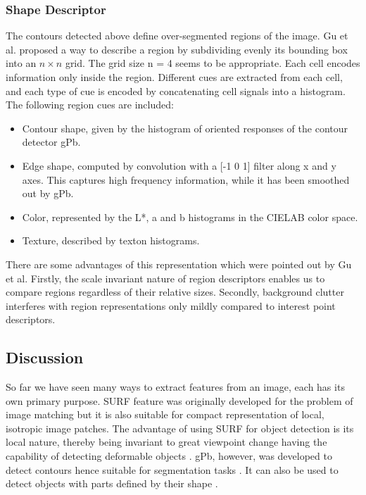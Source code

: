 \documentclass{SMBV12}
\begin{document}
\subsubsection{Shape Descriptor}
\label{sec:shape_descriptor}

The contours detected above define over-segmented regions of the image. Gu et al. \cite{gu2009recognition} proposed a way to describe a region by subdividing evenly its bounding box into an $n \times n$ grid. The grid size n = 4 seems to be appropriate. Each cell encodes information only inside the region. Different cues are extracted from each cell, and each type of cue is encoded by concatenating cell signals into a histogram. The following region cues are included:

\begin{itemize}
\item Contour shape, given by the histogram of oriented responses of the contour detector gPb.
\item Edge shape, computed by convolution with a [-1 0 1] filter along x and y axes. This captures high frequency information, while it has been smoothed out by gPb.
\item Color, represented by the L*, a and b histograms in the CIELAB color space.
\item Texture, described by texton histograms.
\end{itemize}

There are some advantages of this representation which were pointed out by Gu et al. Firstly, the scale invariant nature of region descriptors enables us to compare regions regardless of their relative sizes. Secondly, background clutter interferes with region representations only mildly compared to interest point descriptors.


\subsection{Discussion}

So far we have seen many ways to extract features from an image, each has its own primary purpose. SURF feature was originally developed for the problem of image matching but it is also suitable for compact representation of local, isotropic image patches. The advantage of using SURF for object detection is its local nature, thereby being invariant to great viewpoint change having the capability of detecting deformable objects \cite{VijayGrauman2011}. gPb, however, was developed to detect contours hence suitable for segmentation tasks \cite{arbelaez2009contours} \cite{gu2009recognition}. It can also be used to detect objects with parts defined by their shape \cite{VijayGrauman2011} \cite{gu2009recognition}.
\end{document}
